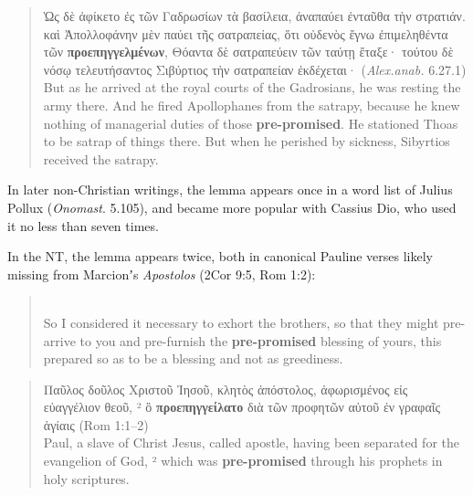 \vspace*{2mm} 
 \begin{quote}Ὡς δὲ ἀφίκετο ἐς τῶν Γαδρωσίων τὰ βασίλεια,
 ἀναπαύει ἐνταῦθα τὴν στρατιάν. %
 καὶ Ἀπολλοφάνην μὲν παύει τῆς σατραπείας, %
 ὅτι οὐδενὸς ἔγνω ἐπιμεληθέντα τῶν \textbf{προεπηγγελμένων}, %
 Θόαντα δὲ σατραπεύειν τῶν ταύτῃ ἔταξε· %
 τούτου δὲ νόσῳ τελευτήσαντος Σιβύρτιος τὴν σατραπείαν ἐκδέχεται· (\textit{Alex.anab.} 6.27.1) \\[1mm] %
 But as he arrived at the royal courts of the Gadrosians, %
 he was resting the army there. %
 And he fired Apollophanes from the satrapy, %
 because he knew nothing of managerial duties of those \textbf{pre-promised}. %
 He stationed Thoas to be satrap of things there. %
 But when he perished by sickness, Sibyrtios received the satrapy. %
 \end{quote} %
 \clearpage

\noindent{}In later non-Christian writings, %
the lemma appears once in a word list of Julius Pollux (\textit{Onomast}. 5.105), %
and became more popular with Cassius Dio, who used it no less than seven times. %

In the NT, the lemma appears twice, both in canonical Pauline verses %
likely missing from Marcionʼs \textit{Apostolos} (2Cor 9:5, Rom 1:2): %

\vspace*{2mm} 
 \begin{quote} \\[1mm] %
 So I considered it necessary to exhort the brothers, %
 so that they might pre-arrive to you and pre-furnish the \textbf{pre-promised} blessing of yours, %
 this prepared so as to be a blessing and not as greediness.\end{quote} %
 \vspace*{1mm}

 \begin{quote}Παῦλος δοῦλος Χριστοῦ Ἰησοῦ, κλητὸς ἀπόστολος, ἀφωρισμένος εἰς εὐαγγέλιον θεοῦ, %
 ² ὃ \textbf{προεπηγγείλατο} διὰ τῶν προφητῶν αὐτοῦ ἐν γραφαῖς ἁγίαις (Rom 1:1--2) \\[1mm] %
 Paul, a slave of Christ Jesus, called apostle, %
 having been separated for the evangelion of God, %
 ² which was \textbf{pre-promised} through his prophets in holy scriptures.\end{quote} %
 \vspace*{2mm} %

